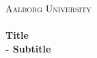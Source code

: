 \begin{titlingpage}\centering

\textsc{\LARGE Aalborg University}\\[0.3cm]

\HRule \\[0.4cm]
{\huge \bfseries Title}\\[0.5cm]
{\Large \bfseries - Subtitle}

\HRule \\[2cm]

\begin{minipage}{\columnwidth}
\end{minipage}


\end{titlingpage}
